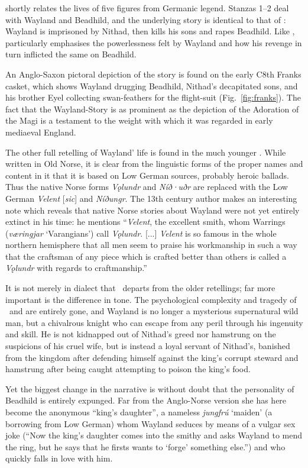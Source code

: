  shortly relates the lives of five figures from Germanic legend.  Stanzas 1--2 deal with Wayland and Beadhild, and the underlying story is identical to that of \Volundarkvida: Wayland is imprisoned by Nithad, then kills his sons and rapes Beadhild.  Like \Volundarkvida,  particularly emphasises the powerlessness felt by Wayland and how his revenge in turn inflicted the same on Beadhild.

An Anglo-Saxon pictoral depiction of the story is found on the early C8th Franks casket, which shows Wayland drugging Beadhild, Nithad’s decapitated sons, and his brother Eyel collecting swan-feathers for the flight-suit (Fig.~\ref{fig:franks}).  The fact that the Wayland-Story is as prominent as the depiction of the Adoration of the Magi is a testament to the weight with which it was regarded in early mediaeval England.

The other full retelling of Wayland’ life is found in the much younger \ThidreksSaga.  While written in Old Norse, it is clear from the linguistic forms of the proper names and content in it that it is based on Low German sources, probably heroic ballads.  Thus the native Norse forms \emph{Vǫlundr} and \emph{Níð·uðr} are replaced with the Low German \emph{Velent} [\emph{sic}] and \emph{Níðungr}.  The 13th century author makes an interesting note which reveals that native Norse stories about Wayland were not yet entirely extinct in his time: he mentions “\emph{Velent}, the excellent smith, whom Warrings (\emph{væringjar} ‘Varangians’) call \emph{Vǫlundr}. [...] \emph{Velent} is so famous in the whole northern hemisphere that all men seem to praise his workmanship in such a way that the craftsman of any piece which is crafted better than others is called a \emph{Vǫlundr} with regards to craftmanship.”

It is not merely in dialect that \ThidreksSaga\ departs from the older retellings; far more important is the difference in tone.  The psychological complexity and tragedy of \Volundarkvida\ and  are entirely gone, and Wayland is no longer a mysterious supernatural wild man, but a chivalrous knight who can escape from any peril through his ingenuity and skill.  He is not kidnapped out of Nithad’s greed nor hamstrung on the suspicions of his cruel wife, but is instead a loyal servant of Nithad’s, banished from the kingdom after defending himself against the king’s corrupt steward and hamstrung after being caught attempting to poison the king’s food.

Yet the biggest change in the narrative is without doubt that the personality of Beadhild is entirely expunged.  Far from the Anglo-Norse version she has here become the anonymous “king’s daughter”, a nameless \emph{jungfrú} ‘maiden’ (a borrowing from Low German) whom Wayland seduces by means of a vulgar sex joke (“Now the king’s daughter comes into the smithy and asks Wayland to mend the ring, but he says that he firsts wants to ‘forge’ something else.”) and who quickly falls in love with him.

